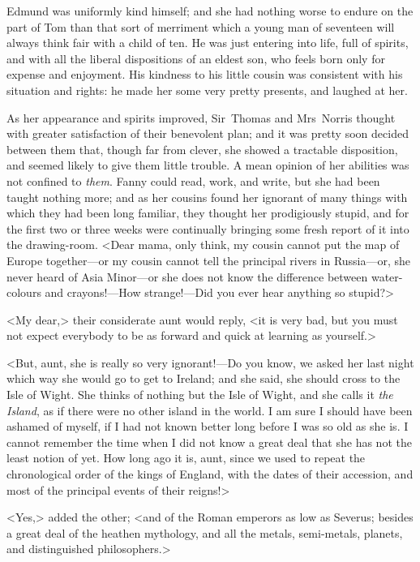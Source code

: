 Edmund was uniformly kind himself; and she had nothing worse to endure on the part of Tom than that sort of merriment which a young man of seventeen will always think fair with a child of ten. He was just entering into life, full of spirits, and with all the liberal dispositions of an eldest son, who feels born only for expense and enjoyment. His kindness to his little cousin was consistent with his situation and rights: he made her some very pretty presents, and laughed at her.

As her appearance and spirits improved, Sir~Thomas and Mrs~Norris thought with greater satisfaction of their benevolent plan; and it was pretty soon decided between them that, though far from clever, she showed a tractable disposition, and seemed likely to give them little trouble. A mean opinion of her abilities was not confined to \textit{them}. Fanny could read, work, and write, but she had been taught nothing more; and as her cousins found her ignorant of many things with which they had been long familiar, they thought her prodigiously stupid, and for the first two or three weeks were continually bringing some fresh report of it into the drawing-room. <Dear mama, only think, my cousin cannot put the map of Europe together—or my cousin cannot tell the principal rivers in Russia—or, she never heard of Asia Minor—or she does not know the difference between water-colours and crayons!—How strange!—Did you ever hear anything so stupid?>

<My dear,> their considerate aunt would reply, <it is very bad, but you must not expect everybody to be as forward and quick at learning as yourself.>

<But, aunt, she is really so very ignorant!—Do you know, we asked her last night which way she would go to get to Ireland; and she said, she should cross to the Isle of Wight. She thinks of nothing but the Isle of Wight, and she calls it \textit{the Island}, as if there were no other island in the world. I am sure I should have been ashamed of myself, if I had not known better long before I was so old as she is. I cannot remember the time when I did not know a great deal that she has not the least notion of yet. How long ago it is, aunt, since we used to repeat the chronological order of the kings of England, with the dates of their accession, and most of the principal events of their reigns!>

<Yes,> added the other; <and of the Roman emperors as low as Severus; besides a great deal of the heathen mythology, and all the metals, semi-metals, planets, and distinguished philosophers.>

